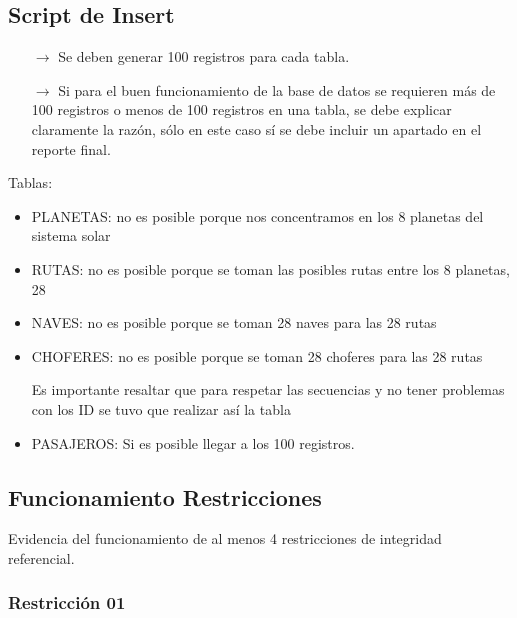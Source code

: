 \subsection{Script de Insert}
\begin{itemize}
    \item[$\rightarrow$] Se deben generar 100 registros para cada tabla.
    \item[$\rightarrow$] Si para el buen funcionamiento de la base de datos se requieren más de 100 registros o
            menos de 100 registros en una tabla, se debe explicar claramente la razón, sólo en este caso
            sí se debe incluir un apartado en el reporte final.
\end{itemize}

Tablas:
\begin{itemize}
  \item PLANETAS: no es posible porque nos concentramos en los 8 planetas del sistema solar
  \item RUTAS: no es posible porque se toman las posibles rutas entre los 8 planetas, 28
  \item NAVES: no es posible porque se toman 28 naves para las 28 rutas
  \item CHOFERES: no es posible porque se toman 28 choferes para las 28 rutas
  
  Es importante resaltar que para respetar las secuencias y no tener problemas con los ID se tuvo que realizar así la tabla

  \item PASAJEROS: Si es posible llegar a los 100 registros.
\end{itemize}

\subsection{Funcionamiento Restricciones}

Evidencia del funcionamiento de al menos 4 restricciones de integridad referencial.

\subsubsection*{Restricción 01}

